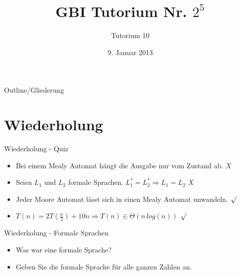 

\title[Tutorium 10]{GBI Tutorium Nr. $2^5$}
\subtitle{Tutorium 10}
\date{9. Januar 2013}






	\begin{frame}
		\titlepage
	\end{frame}

	\begin{frame}{Outline/Gliederung}
		\tableofcontents
	\end{frame}	
		
	
	
	\section{Wiederholung} 
	\begin{frame} {Wiederholung - Quiz}
		\begin{itemize}
			
			\item Bei einem Mealy Automat hängt die Ausgabe nur vom Zustand ab.
			\only<2-> {\color{red}$X$}\\
			\color{black}
			\item Seien $L_1$ und $L_2$ formale Sprachen. $L_1^* = L_2^* \Rightarrow L_1 = L_2$
			\only<3-> {\color{red}$X$}\\
			\color{black}
			
			\item Jeder Moore Automat lässt sich in einen Mealy Automat unwandeln. 
			\only<4-> {\color{darkgreen}$\surd$}\\
			\color{black}
	
			\item $T(n) = 2T(\frac{n}{2}) + 10n \Rightarrow T(n) \in \Theta(n\, log(n))$
			\only<5-> {\color{darkgreen}$\surd$}\\
			\color{black}
		\end{itemize}
	\end{frame}
	
	
	\begin{frame}{Wiederholung - Formale Sprachen}
		\begin{itemize}
			\item Was war eine formale Sprache?
			\item Geben Sie die formale Sprache für alle ganzen Zahlen an.
		\end{itemize}
	\end{frame}
	
